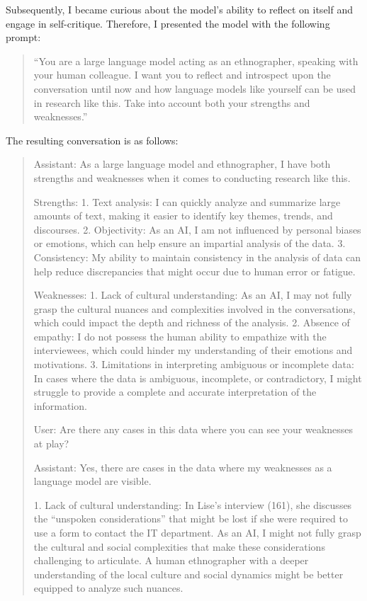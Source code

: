\documentclass[
]{book}
\begin{document}
Subsequently, I became curious about the model's ability to reflect on itself and engage in self-critique. Therefore, I presented the model with the following prompt:

\begin{quote}
``You are a large language model acting as an ethnographer, speaking with your human colleague. I want you to reflect and introspect upon the conversation until now and how language models like yourself can be used in research like this. Take into account both your strengths and weaknesses.''
\end{quote}

The resulting conversation is as follows:

\begin{quote}
Assistant: As a large language model and ethnographer, I have both strengths and weaknesses when it comes to conducting research like this.

Strengths: 1. Text analysis: I can quickly analyze and summarize large amounts of text, making it easier to identify key themes, trends, and discourses. 2. Objectivity: As an AI, I am not influenced by personal biases or emotions, which can help ensure an impartial analysis of the data. 3. Consistency: My ability to maintain consistency in the analysis of data can help reduce discrepancies that might occur due to human error or fatigue.

Weaknesses: 1. Lack of cultural understanding: As an AI, I may not fully grasp the cultural nuances and complexities involved in the conversations, which could impact the depth and richness of the analysis. 2. Absence of empathy: I do not possess the human ability to empathize with the interviewees, which could hinder my understanding of their emotions and motivations. 3. Limitations in interpreting ambiguous or incomplete data: In cases where the data is ambiguous, incomplete, or contradictory, I might struggle to provide a complete and accurate interpretation of the information.

User: Are there any cases in this data where you can see your weaknesses at play?

Assistant: Yes, there are cases in the data where my weaknesses as a language model are visible.

1. Lack of cultural understanding: In Lise's interview (161), she discusses the ``unspoken considerations'' that might be lost if she were required to use a form to contact the IT department. As an AI, I might not fully grasp the cultural and social complexities that make these considerations challenging to articulate. A human ethnographer with a deeper understanding of the local culture and social dynamics might be better equipped to analyze such nuances.


\end{quote}
\end{document}
